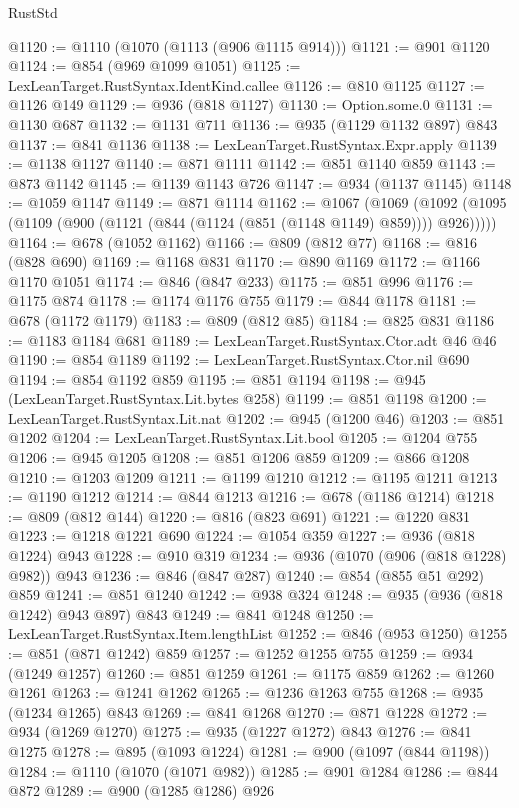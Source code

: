 \begin{lexlean}{RustStd}
\begin{coremodule}
@1120 := @1110 (@1070 (@1113 (@906 @1115 @914)))
@1121 := @901 @1120
@1124 := @854 (@969 @1099 @1051)
@1125 := LexLeanTarget.RustSyntax.IdentKind.callee
@1126 := @810 @1125
@1127 := @1126 @149
@1129 := @936 (@818 @1127)
@1130 := Option.some.{0}
@1131 := @1130 @687
@1132 := @1131 @711
@1136 := @935 (@1129 @1132 @897) @843
@1137 := @841 @1136
@1138 := LexLeanTarget.RustSyntax.Expr.apply
@1139 := @1138 @1127
@1140 := @871 @1111
@1142 := @851 @1140 @859
@1143 := @873 @1142
@1145 := @1139 @1143 @726
@1147 := @934 (@1137 @1145)
@1148 := @1059 @1147
@1149 := @871 @1114
@1162 := @1067
    (@1069 (@1092 (@1095 (@1109 (@900 (@1121 (@844 (@1124 (@851 (@1148 @1149) @859)))) @926)))))
@1164 := @678 (@1052 @1162)
@1166 := @809 (@812 @77)
@1168 := @816 (@828 @690)
@1169 := @1168 @831
@1170 := @890 @1169
@1172 := @1166 @1170 @1051
@1174 := @846 (@847 @233)
@1175 := @851 @996
@1176 := @1175 @874
@1178 := @1174 @1176 @755
@1179 := @844 @1178
@1181 := @678 (@1172 @1179)
@1183 := @809 (@812 @85)
@1184 := @825 @831
@1186 := @1183 @1184 @681
@1189 := LexLeanTarget.RustSyntax.Ctor.adt @46 @46
@1190 := @854 @1189
@1192 := LexLeanTarget.RustSyntax.Ctor.nil @690
@1194 := @854 @1192 @859
@1195 := @851 @1194
@1198 := @945 (LexLeanTarget.RustSyntax.Lit.bytes @258)
@1199 := @851 @1198
@1200 := LexLeanTarget.RustSyntax.Lit.nat
@1202 := @945 (@1200 @46)
@1203 := @851 @1202
@1204 := LexLeanTarget.RustSyntax.Lit.bool
@1205 := @1204 @755
@1206 := @945 @1205
@1208 := @851 @1206 @859
@1209 := @866 @1208
@1210 := @1203 @1209
@1211 := @1199 @1210
@1212 := @1195 @1211
@1213 := @1190 @1212
@1214 := @844 @1213
@1216 := @678 (@1186 @1214)
@1218 := @809 (@812 @144)
@1220 := @816 (@823 @691)
@1221 := @1220 @831
@1223 := @1218 @1221 @690
@1224 := @1054 @359
@1227 := @936 (@818 @1224) @943
@1228 := @910 @319
@1234 := @936 (@1070 (@906 (@818 @1228) @982)) @943
@1236 := @846 (@847 @287)
@1240 := @854 (@855 @51 @292) @859
@1241 := @851 @1240
@1242 := @938 @324
@1248 := @935 (@936 (@818 @1242) @943 @897) @843
@1249 := @841 @1248
@1250 := LexLeanTarget.RustSyntax.Item.lengthList
@1252 := @846 (@953 @1250)
@1255 := @851 (@871 @1242) @859
@1257 := @1252 @1255 @755
@1259 := @934 (@1249 @1257)
@1260 := @851 @1259
@1261 := @1175 @859
@1262 := @1260 @1261
@1263 := @1241 @1262
@1265 := @1236 @1263 @755
@1268 := @935 (@1234 @1265) @843
@1269 := @841 @1268
@1270 := @871 @1228
@1272 := @934 (@1269 @1270)
@1275 := @935 (@1227 @1272) @843
@1276 := @841 @1275
@1278 := @895 (@1093 @1224)
@1281 := @900 (@1097 (@844 @1198))
@1284 := @1110 (@1070 (@1071 @982))
@1285 := @901 @1284
@1286 := @844 @872
@1289 := @900 (@1285 @1286) @926

\end{coremodule}
\end{lexlean}
